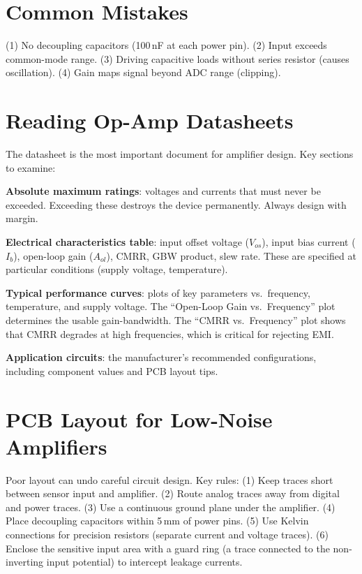 \documentclass[11pt,letterpaper,twoside,openany]{book}
\begin{document}
\section{Common Mistakes}
(1) No decoupling capacitors (100\,nF at each power pin). (2) Input exceeds common-mode range. (3) Driving capacitive loads without series resistor (causes oscillation). (4) Gain maps signal beyond ADC range (clipping).


\section{Reading Op-Amp Datasheets}
The datasheet is the most important document for amplifier design. Key sections to examine:

\textbf{Absolute maximum ratings}: voltages and currents that must never be exceeded. Exceeding these destroys the device permanently. Always design with margin.

\textbf{Electrical characteristics table}: input offset voltage ($V_{os}$), input bias current ($I_b$), open-loop gain ($A_{ol}$), CMRR, GBW product, slew rate. These are specified at particular conditions (supply voltage, temperature).

\textbf{Typical performance curves}: plots of key parameters vs.\ frequency, temperature, and supply voltage. The ``Open-Loop Gain vs.\ Frequency'' plot determines the usable gain-bandwidth. The ``CMRR vs.\ Frequency'' plot shows that CMRR degrades at high frequencies, which is critical for rejecting EMI.

\textbf{Application circuits}: the manufacturer's recommended configurations, including component values and PCB layout tips.

\section{PCB Layout for Low-Noise Amplifiers}
Poor layout can undo careful circuit design. Key rules: (1) Keep traces short between sensor input and amplifier. (2) Route analog traces away from digital and power traces. (3) Use a continuous ground plane under the amplifier. (4) Place decoupling capacitors within 5\,mm of power pins. (5) Use Kelvin connections for precision resistors (separate current and voltage traces). (6) Enclose the sensitive input area with a guard ring (a trace connected to the non-inverting input potential) to intercept leakage currents.
\end{document}
